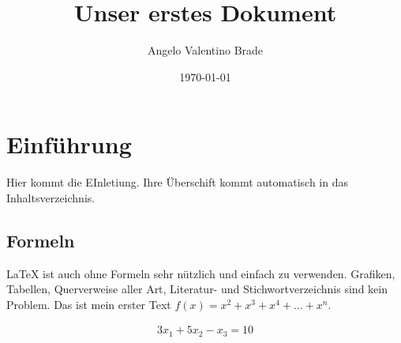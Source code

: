 \documentclass[a4paper, 12pt]{article}
\title{Unser erstes Dokument}
\author{Angelo Valentino Brade}
\date{\today}
\begin{document}
\maketitle
\tableofcontents

\section{Einführung}
Hier kommt die EInletiung. Ihre Überschift kommt automatisch in das Inhaltsverzeichnis.

\subsection*{Formeln}
\LaTeX{} ist auch ohne Formeln sehr nützlich und einfach zu verwenden. Grafiken, Tabellen, Querverweise aller Art, Literatur- und Stichwortverzeichnis sind kein Problem.
    Das ist mein erster Text \(f(x) = x^2 + x^3 + x^4 + \dots + x^n\).


\begin{eqnarray}
    3x_1 + 5x_2 - x_3 = 10
\end{eqnarray}
\end{document}
